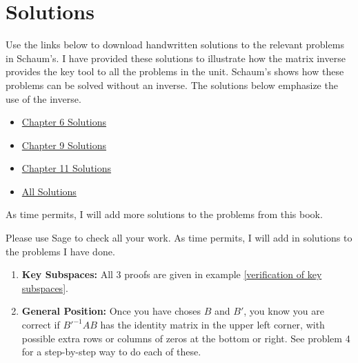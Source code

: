 
\section{Solutions}
{\small
\begin{multicols}{2}

Use the links below to download handwritten solutions to the relevant problems in Schaum's. I have provided these solutions to illustrate how the matrix inverse provides the key tool to all the problems in the unit.  Schaum's shows how these problems can be solved without an inverse. The solutions below emphasize the use of the inverse.
\begin{itemize}
\item \href{http://ilearn.byui.edu/bbcswebdav/institution/Physical\_Sci\_Eng/Mathematics/Personal\%20Folders/WoodruffB/341/5-Chp6-Solutions.pdf}{Chapter 6 Solutions}
\item \href{http://ilearn.byui.edu/bbcswebdav/institution/Physical\_Sci\_Eng/Mathematics/Personal\%20Folders/WoodruffB/341/5-Chp9-Solutions.pdf}{Chapter 9 Solutions}
\item \href{http://ilearn.byui.edu/bbcswebdav/institution/Physical\_Sci\_Eng/Mathematics/Personal\%20Folders/WoodruffB/341/5-Chp11-Solutions.pdf}{Chapter 11 Solutions}
\item \href{http://ilearn.byui.edu/bbcswebdav/institution/Physical\_Sci\_Eng/Mathematics/Personal\%20Folders/WoodruffB/341/5-All-Solutions.pdf}{All Solutions}

\end{itemize}

As time permits, I will add more solutions to the problems from this book. 



Please use Sage to check all your work.  As time permits, I will add in solutions to the problems I have done.

\begin{enumerate}

\item \textbf{Key Subspaces:} All 3 proofs are given in example \ref{verification of key subspaces}.

\item  \textbf{General Position:} Once you have choses $B$ and $B'$, you know you are correct if $B'^{-1} A B$ has the identity matrix in the upper left corner, with possible extra rows or columns of zeros at the bottom or right. See problem 4 for a step-by-step way to do each of these. 


\end{enumerate}
\end{multicols}}
